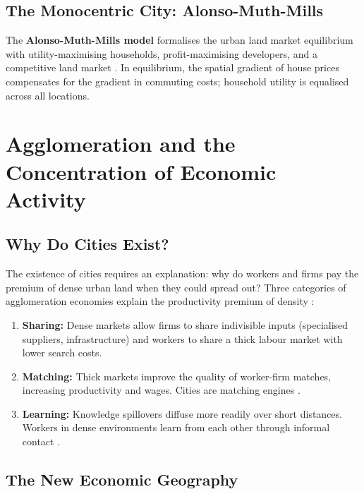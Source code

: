 \subsection{The Monocentric City: Alonso-Muth-Mills}

The \textbf{Alonso-Muth-Mills model} formalises
the urban land market equilibrium with utility-maximising households,
profit-maximising developers, and a competitive land market
\citep{Alonso1964, Muth1969, Mills1967}. In equilibrium, the spatial
gradient of house prices compensates for the gradient in commuting costs;
household utility is equalised across all locations.



\section{Agglomeration and the Concentration of Economic Activity}
\label{sec_Agglomeration}

\subsection{Why Do Cities Exist?}

The existence of cities requires an explanation: why do workers and firms
pay the premium of dense urban land when they could spread out? Three
categories of agglomeration economies explain
the productivity premium of density \citep{Duranton2004}:

\begin{enumerate}
  \item \textbf{Sharing:} Dense markets allow firms to share indivisible
    inputs (specialised suppliers, infrastructure) and workers to share a
    thick labour market with lower search costs.
  \item \textbf{Matching:} Thick markets improve the quality of
    worker-firm matches, increasing productivity and wages. Cities are
    matching engines \citep{Helsley1990}.
  \item \textbf{Learning:} Knowledge spillovers diffuse more readily over
    short distances. Workers in dense environments learn from each other
    through informal contact \citep{Glaeser1992}.
\end{enumerate}

\subsection{The New Economic Geography}

